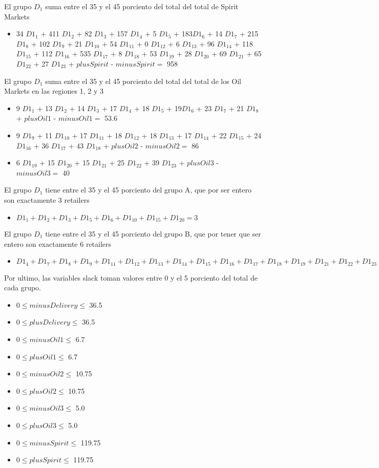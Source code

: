 El grupo $D_1$ suma entre el 35 y el 45 porciento del total del total de Spirit Markets
\begin{itemize}
\item 34 ${D1}_1$ + 411 ${D1}_2$ + 82 ${D1}_3$ + 157 ${D1}_4$ + 5 ${D1}_5$ + 183${D1}_6$ + 14 ${D1}_7$ + 215 ${D1}_8$ + 102 ${D1}_9$ + 21 ${D1}_{10}$ + 54 ${D1}_{11}$ + 0 ${D1}_{12}$ + 6 ${D1}_{13}$ + 96 ${D1}_{14}$ + 118 ${D1}_{15}$ + 112 ${D1}_{16}$ + 535 ${D1}_{17}$ + 8 ${D1}_{18}$ + 53 ${D1}_{19}$ + 28 ${D1}_{20}$ + 69 ${D1}_{21}$ + 65 ${D1}_{22}$ + 27 ${D1}_{23}$ + $plusSpirit$ - $minusSpirit = $ 958
\end{itemize}
El grupo $D_1$ suma entre el 35 y el 45 porciento del total del total de los Oil Markets en las regiones 1, 2 y 3
\begin{itemize}
\item 9 ${D1}_1$ + 13 ${D1}_2$ + 14 ${D1}_3$ + 17 ${D1}_4$ + 18 ${D1}_5$ + 19${D1}_6$ + 23 ${D1}_7$ + 21 ${D1}_8$ + $plusOil1$ - $minusOil1 = $ 53.6
\item 9 ${D1}_9$ + 11 ${D1}_{10}$ + 17 ${D1}_{11}$ + 18 ${D1}_{12}$ + 18 ${D1}_{13}$ + 17 ${D1}_{14}$ + 22 ${D1}_{15}$ + 24 ${D1}_{16}$ + 36 ${D1}_{17}$ + 43 ${D1}_{18}$ + $plusOil2$ - $minusOil2 = $ 86
\item 6 ${D1}_{19}$ + 15 ${D1}_{20}$ + 15 ${D1}_{21}$ + 25 ${D1}_{22}$ + 39 ${D1}_{23}$ + $plusOil3$ - $minusOil3 = $ 40
\end{itemize}
El grupo $D_1$ tiene entre el 35 y el 45 porciento del grupo A, que por ser entero son exactamente 3 retailers
\begin{itemize}
\item ${D1}_1 + {D1}_2 + {D1}_3 + {D1}_5 + {D1}_6 + {D1}_{10} + {D1}_{15} + {D1}_{20} = 3$ \\
\end{itemize}
El grupo $D_1$ tiene entre el 35 y el 45 porciento del grupo B, que por tener que ser entero son exactamente 6 retailers
\begin{itemize}
\item ${D1}_4 + {D1}_7 + {D1}_8 + {D1}_9 + {D1}_{11} + {D1}_{12} + {D1}_{13} + {D1}_{14} + {D1}_{15} + {D1}_{16} + {D1}_{17} + {D1}_{18} + {D1}_{19} + {D1}_{21} + {D1}_{22} + {D1}_{23}   = 6$
\end{itemize}
Por ultimo, las variables slack toman valores entre 0 y el 5 porciento del total de cada grupo.
\begin{itemize}
\item $0 \leq minusDelivery \leq$ 36.5
\item $0 \leq plusDelivery \leq$ 36.5
\item $0 \leq minusOil1 \leq$ 6.7
\item $0 \leq plusOil1 \leq$ 6.7
\item $0 \leq minusOil2 \leq$ 10.75
\item $0 \leq plusOil2 \leq$ 10.75
\item $0 \leq minusOil3 \leq$ 5.0
\item $0 \leq plusOil3 \leq$ 5.0
\item $0 \leq minusSpirit \leq$ 119.75
\item $0 \leq plusSpirit \leq$ 119.75
\end{itemize}
